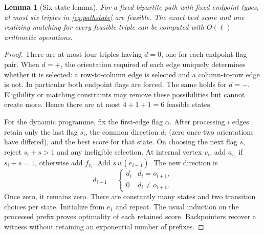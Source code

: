 \documentclass[11pt,letterpaper]{article}
\newtheorem{lemma}[lemma]{Lemma}\aliascntresetthe{lemma}
\theoremstyle{definition}
\theoremstyle{remark}
\begin{document}
\begin{lemma}[Six-state lemma]
\label{lem:six}
For a fixed bipartite path with fixed endpoint types, at most six triples in \cref{eq:pathstate} are feasible. The exact best score and one realizing matching for every feasible triple can be computed with $O(\ell)$ arithmetic operations.
\end{lemma}
\begin{proof}
There are at most four triples having $d=0$, one for each endpoint-flag pair. When $d=+$, the orientation required of each edge uniquely determines whether it is selected: a row-to-column edge is selected and a column-to-row edge is not. In particular both endpoint flags are forced. The same holds for $d=-$. Eligibility or matching constraints may remove these possibilities but cannot create more. Hence there are at most $4+1+1=6$ feasible states.

For the dynamic programme, fix the first-edge flag $\alpha$. After processing $i$ edges retain only the last flag $s_i$, the common direction $d_i$ (zero once two orientations have differed), and the best score for that state. On choosing the next flag $s$, reject $s_i+s>1$ and any ineligible selection. At internal vertex $v_i$, add $a_{v_i}$ if $s_i+s=1$, otherwise add $f_{v_i}$. Add $s\,w(e_{i+1})$. The new direction is
\[
 d_{i+1}=\begin{cases}d_i&d_i=o_{i+1},\\0&d_i\ne o_{i+1}.
 \end{cases}
\]
Once zero, it remains zero. There are constantly many states and two transition choices per state. Initialize from $e_1$ and repeat. The usual induction on the processed prefix proves optimality of each retained score. Backpointers recover a witness without retaining an exponential number of prefixes.
\end{proof}
\end{document}
